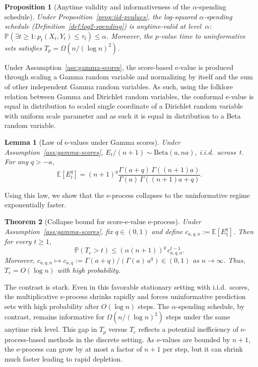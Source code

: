 \documentclass{uai2026} %
\newtheorem{theorem}{Theorem}[section]
\newtheorem{proposition}[theorem]{Proposition}
\newtheorem{lemma}{Lemma}
\newcommand{\1}{\mathbf{1}}
\newcommand{\prob}{\mathbb{P}}
\newcommand{\expec}{\mathbb{E}}
\begin{document}
\begin{proposition}[Anytime validity and informativeness of the $\alpha$-spending schedule]
  \label{prop:log2-spending}
  Under Proposition~\ref{prop:iid-pvalues}, the log-squared $\alpha$-spending schedule (Definition~\ref{def:log2-spending}) is anytime-valid at level~$\alpha$: $\prob(\exists t \ge 1 : p_t(X_t, Y_t) \le \tau_t) \le \alpha$.
  Moreover, the $p$-value time to uninformative sets satisfies $T_p = \Omega(n / (\log n)^2)$.
\end{proposition}


Under Assumption~\ref{ass:gamma-scores}, the score-based e-value is produced through scaling a Gamma random variable and normalizing by itself and the sum of other independent Gamma random variables. As such, using the folklore relation between Gamma and Dirichlet random variables, the conformal e-value is equal in distribution to scaled single coordinate of a Dirichlet random variable with uniform scale parameter and as such it is equal in distribution to a Beta random variable. 

\begin{lemma}[Law of e-values under Gamma scores]
  \label{lem:beta-law}
  Under Assumption~\ref{ass:gamma-scores},
  $E_t / (n{+}1) \sim \mathrm{Beta}(a, na)$, i.i.d.\ across~$t$.
  For any $q > -a$,
  \begin{equation}
    \label{eq:Eq-moment}
    \expec[E_t^q]
    = (n{+}1)^q \frac{\Gamma(a{+}q)\,\Gamma((n{+}1)a)}{\Gamma(a)\,\Gamma((n{+}1)a{+}q)}.
  \end{equation}
\end{lemma}

Using this law, we show that the e-process collapses to the uninformative regime exponentially faster.

\begin{theorem}[Collapse bound for score-e-value e-process]
  \label{thm:Tfull-bound}
  Under Assumption~\ref{ass:gamma-scores}, fix $q \in (0,1)$ and define $c_{a,q,n} := \expec[E_1^q]$.
  Then for every $t \ge 1$,
  \begin{equation}
    \label{eq:Tfull-tail}
    \prob(T_e > t) \le (\alpha(n{+}1))^q\, c_{a,q,n}^{t-1}.
  \end{equation}
  Moreover, $c_{a,q,n} \mapsto c_{a,q} := \Gamma(a{+}q)/(\Gamma(a)\,a^q) \in (0,1)$ as $n \to \infty$.
  Thus, $T_e = O(\log n)$ with high probability.
\end{theorem}

The contrast is stark.
Even in this favorable stationary setting with i.i.d.\ scores, the multiplicative e-process shrinks rapidly and forces uninformative prediction sets with high probability after $O(\log n)$ steps.
The $\alpha$-spending schedule, by contrast, remains informative for $\Omega(n / (\log n)^2)$ steps under the same anytime risk level.
This gap in $T_p$ versus $T_e$ reflects a potential inefficiency of e-process-based methods in the discrete setting. As e-values are bounded by $n{+}1$, the e-process can grow by at most a factor of $n{+}1$ per step, but it can shrink much faster leading to rapid depletion.
\end{document}

